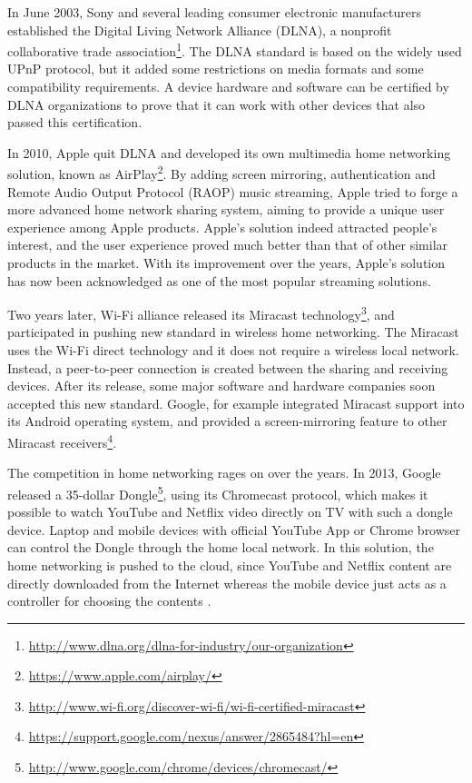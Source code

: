 In June 2003, Sony and several leading consumer electronic manufacturers
established the Digital Living Network Alliance (DLNA), a nonprofit 
collaborative trade association\footnote{\url{http://www.dlna.org/dlna-for-industry/our-organization}}. The
DLNA standard is based on the widely used UPnP protocol, but it added some
restrictions on media formats and some compatibility requirements. A device
hardware and software can be certified by DLNA organizations to prove that it
can work with other devices that also passed this certification.

In 2010, Apple quit DLNA and developed its own multimedia home networking 
solution, known as AirPlay\footnote{\url{https://www.apple.com/airplay/}}. By
adding screen mirroring, authentication and Remote Audio Output Protocol (RAOP)
music streaming, Apple tried to forge a more advanced home network sharing
system, aiming to provide a unique user experience among Apple products.
Apple's solution indeed attracted people's interest, and the user experience
proved much better than that of other similar products in the market. With its
improvement over the years,  Apple's solution has now been acknowledged as one
of the most popular streaming solutions.

Two years later, Wi-Fi alliance released its Miracast
technology\footnote{\url{http://www.wi-fi.org/discover-wi-fi/wi-fi-certified-miracast}},
and participated in pushing new standard in wireless home networking. The
Miracast uses the Wi-Fi direct technology \cite{miracast_consumer} and it does
not require a wireless local network. Instead, a peer-to-peer connection is
created between the sharing and receiving devices. After its release, some
major software and hardware companies soon accepted this new standard. Google,
for example integrated Miracast support into its Android operating system, and
provided a screen-mirroring feature to other Miracast
receivers\footnote{\url{https://support.google.com/nexus/answer/2865484?hl=en}}.

The competition in home networking rages on over the years. In 2013, Google
released a 35-dollar
Dongle\footnote{\url{http://www.google.com/chrome/devices/chromecast/}}, using
its Chromecast protocol, which makes it possible to watch YouTube and Netflix
video directly on TV with such a dongle device. Laptop and mobile devices with
official YouTube App or Chrome browser can control the Dongle through the home
local network. In this solution, the home networking is pushed to the cloud,
since YouTube and Netflix content are directly downloaded from the Internet
whereas the mobile device just acts as a controller for choosing the
contents \cite{dial}.

